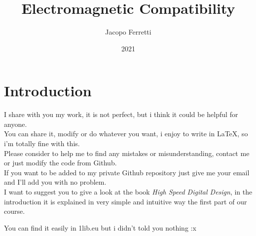 \documentclass{article}
\title{Electromagnetic Compatibility}
\date{2021}
\author{Jacopo Ferretti}
\numberwithin{equation}{section}
\numberwithin{figure}{section}
\begin{document}
\maketitle
\begin{center}
  \Huge{}
\end{center}
\newpage
\tableofcontents
\newpage
\section*{Introduction}
I share with you my work, it is not perfect, but i think it could be helpful for anyone.\\
You can share it, modify or do whatever you want, i enjoy to write in \LaTeX, so i'm totally fine with this.\\
Please consider to help me to find any mistakes or misunderstanding, contact me or just modify the code from Github.\\
If you want to be added to my private Github repository just give me your email and I'll add you with no problem.\\
I want to suggest you to give a look at the book \emph{High Speed Digital Design}\cite{zhang_book}, in the introduction it is explained in very simple and intuitive way the first part of our course.\\
\begin{footnotesize}
  You can find it easily in 1lib.eu but i didn't told you nothing :x
\end{footnotesize}
\newpage







\medskip


\end{document}
